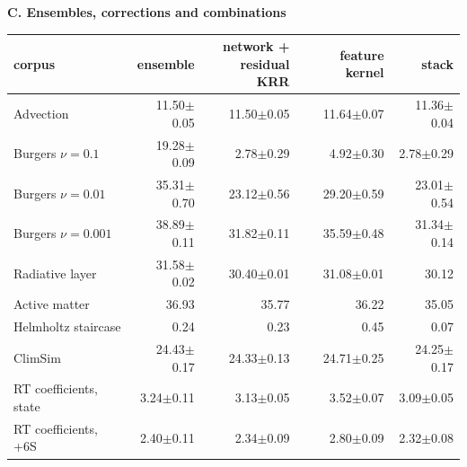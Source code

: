 \par\medskip\textbf{C. Ensembles, corrections and combinations}\par\medskip
{\fontsize{9}{11}\selectfont
\setlength{\tabcolsep}{3pt}
\begin{tabular}{lrrrr}
\toprule
corpus & ensemble & \thead{network +\\residual KRR} & feature kernel & stack \\
\midrule
Advection & 11.50$\pm$0.05 & 11.50$\pm$0.05 & 11.64$\pm$0.07 & 11.36$\pm$0.04 \\
Burgers $\nu=0.1$ & 19.28$\pm$0.09 & 2.78$\pm$0.29 & 4.92$\pm$0.30 & 2.78$\pm$0.29 \\
Burgers $\nu=0.01$ & 35.31$\pm$0.70 & 23.12$\pm$0.56 & 29.20$\pm$0.59 & 23.01$\pm$0.54 \\
Burgers $\nu=0.001$ & 38.89$\pm$0.11 & 31.82$\pm$0.11 & 35.59$\pm$0.48 & 31.34$\pm$0.14 \\
Radiative layer & 31.58$\pm$0.02 & 30.40$\pm$0.01 & 31.08$\pm$0.01 & 30.12 \\
Active matter & 36.93 & 35.77 & 36.22 & 35.05 \\
Helmholtz staircase & 0.24 & 0.23 & 0.45 & 0.07 \\
ClimSim & 24.43$\pm$0.17 & 24.33$\pm$0.13 & 24.71$\pm$0.25 & 24.25$\pm$0.17 \\
RT coefficients, state & 3.24$\pm$0.11 & 3.13$\pm$0.05 & 3.52$\pm$0.07 & 3.09$\pm$0.05 \\
RT coefficients, +6S & 2.40$\pm$0.11 & 2.34$\pm$0.09 & 2.80$\pm$0.09 & 2.32$\pm$0.08 \\
\bottomrule
\end{tabular}}
